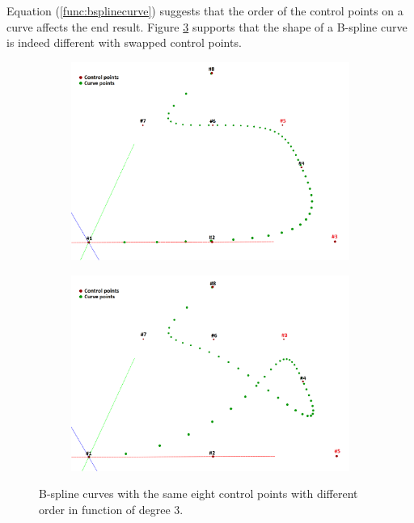 \documentclass{article}
\begin{document}
Equation (\ref{func:bsplinecurve}) suggests that the order of the control points on a curve affects the end result. Figure \ref{bsplinecurvecomparsion} supports that the shape of a B-spline curve is indeed different with swapped control points.

\begin{figure}[H]
\centering
\begin{subfigure}[b]{0.48\textwidth}
\includegraphics[width=\textwidth]{bsplinecurve1}
\caption{}
\label{bsplincecurve1}
\end{subfigure}
\begin{subfigure}[b]{0.48\textwidth}
\includegraphics[width=\textwidth]{bsplinecurve2}
\caption{}
\label{bsplincecurve2}
\end{subfigure}
\caption{B-spline curves with the same eight control points with different order in function of degree 3.}
\label{bsplinecurvecomparsion}
\end{figure}
\end{document}
